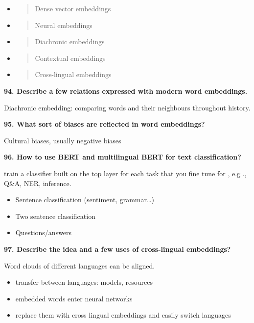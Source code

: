 \begin{itemize}
\item
  \begin{quote}
  Dense vector embeddings
  \end{quote}
\item
  \begin{quote}
  Neural embeddings
  \end{quote}
\item
  \begin{quote}
  Diachronic embeddings
  \end{quote}
\item
  \begin{quote}
  Contextual embeddings
  \end{quote}
\item
  \begin{quote}
  Cross-lingual embeddings
  \end{quote}
\end{itemize}

\textbf{94. Describe a few relations expressed with modern word
embeddings.}

Diachronic embedding: comparing words and their neighbours throughout
history.

\textbf{95. What sort of biases are reflected in word embeddings?}

Cultural biases, usually negative biases

\textbf{96. How to use BERT and multilingual BERT for text
classification?}

train a classifier built on the top layer for each task that you fine
tune for , e.g ., Q\&A, NER, inference.

\begin{itemize}
\item Sentence classification (sentiment, grammar\ldots)
\item Two sentence classification
\item Questions/answers
\end{itemize}


\textbf{97. Describe the idea and a few uses of cross-lingual
embeddings?}

Word clouds of different languages can be aligned.

\begin{itemize}
\item transfer between languages: models, resources
\item embedded words enter neural networks
\item replace them with cross lingual embeddings and easily switch languages
\end{itemize}

